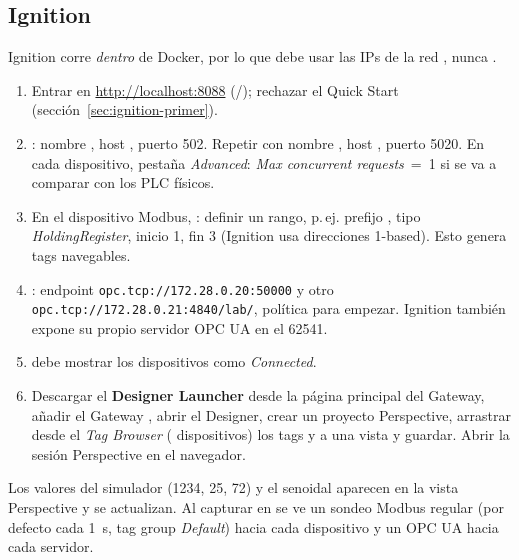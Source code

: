 \subsection{Ignition}
\label{sec:prac-ignition}

Ignition corre \emph{dentro} de Docker, por lo que debe usar las IPs de la red \lab{}, nunca .

\begin{enumerate}
  \item Entrar en \url{http://localhost:8088} (/); rechazar el Quick Start (sección~\ref{sec:ignition-primer}).
  \item {}: nombre , host , puerto 502. Repetir con nombre , host , puerto 5020. En cada dispositivo, pestaña \emph{Advanced}: \emph{Max concurrent requests}~=~1 si se va a comparar con los PLC físicos.
  \item En el dispositivo Modbus, : definir un rango, p.\,ej. prefijo , tipo \emph{HoldingRegister}, inicio 1, fin 3 (Ignition usa direcciones 1-based). Esto genera tags navegables.
  \item {}: endpoint \nolinkurl{opc.tcp://172.28.0.20:50000} y otro \nolinkurl{opc.tcp://172.28.0.21:4840/lab/}, política  para empezar. Ignition también expone su propio servidor OPC UA en el 62541.
  \item {} debe mostrar los dispositivos como \emph{Connected}.
  \item Descargar el \textbf{Designer Launcher} desde la página principal del Gateway, añadir el Gateway , abrir el Designer, crear un proyecto Perspective, arrastrar desde el \emph{Tag Browser} (\cmd{[default]} \ra{} dispositivos) los tags  y  a una vista y guardar. Abrir la sesión Perspective en el navegador.
\end{enumerate}

\begin{ok}
Los valores del simulador (1234, 25, 72) y el  senoidal aparecen en la vista Perspective y se actualizan. Al capturar en  se ve un sondeo Modbus regular (por defecto cada 1~s, tag group \emph{Default}) hacia cada dispositivo y un  OPC UA hacia cada servidor.
\end{ok}

